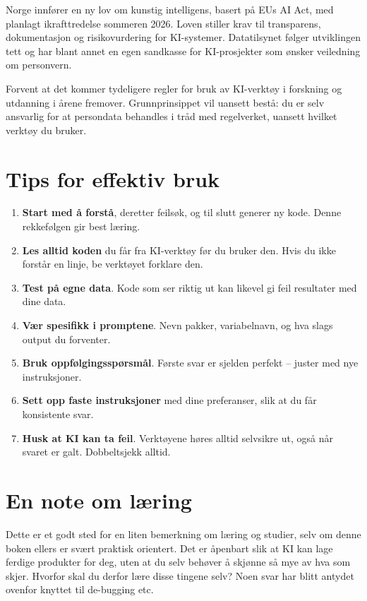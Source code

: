 \documentclass[
  norsk,
  letterpaper,
  DIV=11,
  numbers=noendperiod]{scrreprt}
\providecommand{\tightlist}{%
  \setlength{\itemsep}{0pt}\setlength{\parskip}{0pt}}
\theoremstyle{definition}
\theoremstyle{remark}
\begin{document}
Norge innfører en ny lov om kunstig intelligens, basert på EUs AI Act,
med planlagt ikrafttredelse sommeren 2026. Loven stiller krav til
transparens, dokumentasjon og risikovurdering for KI-systemer.
Datatilsynet følger utviklingen tett og har blant annet en egen
sandkasse for KI-prosjekter som ønsker veiledning om personvern.

Forvent at det kommer tydeligere regler for bruk av KI-verktøy i
forskning og utdanning i årene fremover. Grunnprinsippet vil uansett
bestå: du er selv ansvarlig for at persondata behandles i tråd med
regelverket, uansett hvilket verktøy du bruker.

\section{Tips for effektiv bruk}\label{tips-for-effektiv-bruk}

\begin{enumerate}
\def\labelenumi{\arabic{enumi}.}
\tightlist
\item
  \textbf{Start med å forstå}, deretter feilsøk, og til slutt generer ny
  kode. Denne rekkefølgen gir best læring.
\item
  \textbf{Les alltid koden} du får fra KI-verktøy før du bruker den.
  Hvis du ikke forstår en linje, be verktøyet forklare den.
\item
  \textbf{Test på egne data}. Kode som ser riktig ut kan likevel gi feil
  resultater med dine data.
\item
  \textbf{Vær spesifikk i promptene}. Nevn pakker, variabelnavn, og hva
  slags output du forventer.
\item
  \textbf{Bruk oppfølgingsspørsmål}. Første svar er sjelden perfekt --
  juster med nye instruksjoner.
\item
  \textbf{Sett opp faste instruksjoner} med dine preferanser, slik at du
  får konsistente svar.
\item
  \textbf{Husk at KI kan ta feil}. Verktøyene høres alltid selvsikre ut,
  også når svaret er galt. Dobbeltsjekk alltid.
\end{enumerate}

\section{En note om læring}\label{en-note-om-luxe6ring}

Dette er et godt sted for en liten bemerkning om læring og studier, selv
om denne boken ellers er svært praktisk orientert. Det er åpenbart slik
at KI kan lage ferdige produkter for deg, uten at du selv behøver å
skjønne så mye av hva som skjer. Hvorfor skal du derfor lære disse
tingene selv? Noen svar har blitt antydet ovenfor knyttet til de-bugging
etc.
\end{document}
